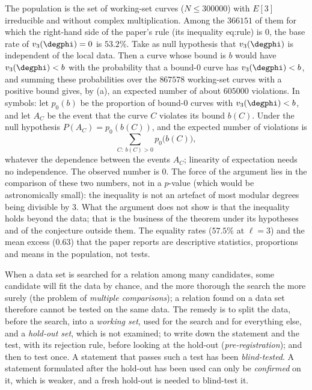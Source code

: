 \begin{example}\label{ex:prereq:calibration}
The population is the set of working-set curves ($N\le300000$) with $E[3]$ irreducible and without
complex multiplication. Among the $366151$ of them for which the right-hand side of the paper's
rule (its inequality eq:rule) is $0$, the base rate of $v_3(\degphi)=0$ is $53.2\%$. Take as null
hypothesis that $v_3(\degphi)$ is independent of the local data. Then a curve whose bound is $b$
would have $v_3(\degphi)<b$ with the probability that a bound-$0$ curve has $v_3(\degphi)<b$, and
summing these probabilities over the $867578$ working-set curves with a positive bound gives, by
(a), an expected number of about $605000$ violations. In symbols: let
$p_0(b)$ be the proportion of bound-$0$ curves with $v_3(\degphi)<b$, and let $A_C$ be the event that
the curve $C$ violates its bound $b(C)$. Under the null hypothesis $P(A_C)=p_0(b(C))$, and the
expected number of violations is
\[
\sum_{C:\ b(C)>0}p_0\bigl(b(C)\bigr),
\]
whatever the dependence between the events $A_C$; linearity of expectation needs no independence. The observed
number is $0$. The force of the argument lies in the comparison of these two numbers, not in a
$p$-value (which would be astronomically small): the inequality is not an artefact of most modular
degrees being divisible by $3$. What the argument does not show is that the inequality holds beyond
the data; that is the business of the theorem under its hypotheses and of the conjecture outside
them. The equality rates ($57.5\%$ at $\ell=3$) and the mean excess ($0.63$) that the paper reports
are descriptive statistics, proportions and means in the population, not tests.
\end{example}

\begin{definition}\label{def:prereq:holdout}
When a data set is searched for a relation among many candidates, some candidate will fit the data
by chance, and the more thorough the search the more surely (the problem of \emph{multiple
comparisons}); a relation found on a data set therefore cannot be tested on the same data. The
remedy is to split the data, before the search, into a \emph{working set}, used for the search and
for everything else, and a \emph{hold-out set}, which is not examined; to write down the statement
and the test, with its rejection rule, before looking at the hold-out (\emph{pre-registration}); and
then to test once. A statement that passes such a test has been \emph{blind-tested}. A statement
formulated after the hold-out has been used can only be \emph{confirmed} on it, which is weaker,
and a fresh hold-out is needed to blind-test it.
\end{definition}

